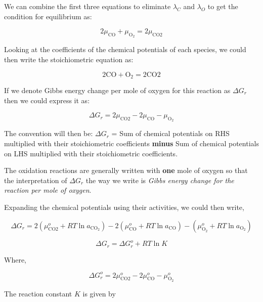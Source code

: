 We can combine the first three equations to eliminate $\lambda_C$ and $\lambda_O$ to get the condition for equilibrium as:

\begin{equation} 2 \mu_{\text{CO}} + \mu_{\text{O}_2} = 2 \mu_{\text{CO}2} \end{equation}

Looking at the coefficients of the chemical potentials of each species, we could then write the stoichiometric equation as:

\begin{equation} 2 \text{CO} + \text{O}_2 = 2 \text{CO}2 \end{equation}

If we denote Gibbs energy change per mole of oxygen for this reaction as $\Delta G_r$ then we could express it as:

\begin{equation} \Delta G_r = 2 \mu_{\text{CO}2} - 2 \mu_{\text{CO}} - \mu_{\text{O}_2} \end{equation}

The convention will then be: $\Delta G_r$ = Sum of chemical potentials on RHS multiplied with their stoichiometric coefficients {\bf minus} Sum of chemical potentials on LHS multiplied with their stoichiometric coefficients. 

The oxidation reactions are generally written with {\bf one} mole of oxygen so that the interpretation of $\Delta G_r$ the way we write is {\em Gibbs energy change for the reaction per mole of oxygen}.

Expanding the chemical potentials using their activities, we could then write,

\begin{equation} \Delta G_r = 2 \left( \mu^o_{\text{CO}2} + RT \ln a_{\text{CO}_2}\right) - 2  \left( \mu^o_{\text{CO}} + RT \ln a_\text{CO} \right) - \left( \mu^o_{\text{O}_2} + RT \ln a_{\text{O}_2} \right) \end{equation}

\begin{equation} \Delta G_r = \Delta G^o_r + R T \ln K \end{equation}

Where,

\begin{equation} \Delta G^o_r = 2 \mu^o_{\text{CO}2} - 2 \mu^o_{\text{CO}} - \mu^o_{\text{O}_2} \end{equation}


The reaction constant $K$ is given by

